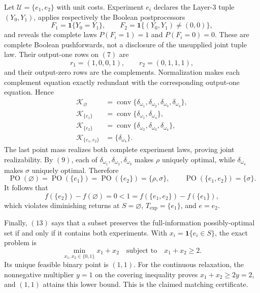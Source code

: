 Let \(\mathcal U=\{e_1,e_2\}\) with unit costs.  Experiment \(e_i\) declares the
Layer-3 tuple \((Y_0,Y_1)\), applies respectively the Boolean postprocessors
\[
F_1=\mathbf1\{Y_0=Y_1\},
\qquad
F_2=\mathbf1\{(Y_0,Y_1)\ne(0,0)\},
\tag{10}
\]
and reveals the complete laws \(P(F_i=1)=1\) and \(P(F_i=0)=0\).  These are
complete Boolean pushforwards, not a disclosure of the unsupplied joint tuple law.
Their output-one rows on \((7)\) are
\[
r_1=(1,0,0,1),
\qquad
r_2=(0,1,1,1),
\tag{11}
\]
and their output-zero rows are the complements.  Normalization makes each complement
equation exactly redundant with the corresponding output-one equation.  Hence
\[
\begin{aligned}
\mathcal K_{\varnothing}
 &=\operatorname{conv}\{\delta_{\omega_1},\delta_{\omega_2},
     \delta_{\omega_3},\delta_{\omega_4}\},\\
\mathcal K_{\{e_1\}}
 &=\operatorname{conv}\{\delta_{\omega_1},\delta_{\omega_4}\},\\
\mathcal K_{\{e_2\}}
 &=\operatorname{conv}\{\delta_{\omega_2},\delta_{\omega_3},
     \delta_{\omega_4}\},\\
\mathcal K_{\{e_1,e_2\}}
 &=\{\delta_{\omega_4}\}.
\end{aligned}
\tag{12}
\]
The last point mass realizes both complete experiment laws, proving joint
realizability.  By \((9)\), each of
\(\delta_{\omega_1},\delta_{\omega_2},\delta_{\omega_3}\) makes \(\rho\) uniquely
optimal, while \(\delta_{\omega_4}\) makes \(\sigma\) uniquely optimal.  Therefore
\[
\operatorname{PO}(\varnothing)=
\operatorname{PO}(\{e_1\})=
\operatorname{PO}(\{e_2\})=\{\rho,\sigma\},
\qquad
\operatorname{PO}(\{e_1,e_2\})=\{\sigma\}.
\tag{13}
\]
It follows that
\[
f(\{e_2\})-f(\varnothing)=0
<1=f(\{e_1,e_2\})-f(\{e_1\}),
\tag{14}
\]
which violates diminishing returns at \(S=\varnothing\),
\(T_{\mathrm{exp}}=\{e_1\}\), and \(e=e_2\).

Finally, \((13)\) says that a subset preserves the full-information possibly-optimal
set if and only if it contains both experiments.  With
\(x_i=\mathbf1\{e_i\in S\}\), the exact problem is
\[
\min_{x_1,x_2\in\{0,1\}}x_1+x_2
\quad\text{subject to}\quad x_1+x_2\geq2.
\tag{15}
\]
Its unique feasible binary point is \((1,1)\).  For the continuous relaxation, the
nonnegative multiplier \(y=1\) on the covering inequality proves
\(x_1+x_2\geq2y=2\), and \((1,1)\) attains this lower bound.  This is the claimed
matching certificate.